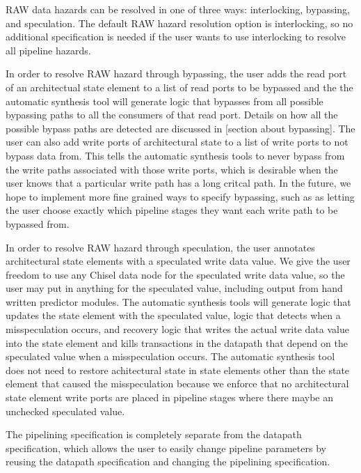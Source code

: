 RAW data hazards can be resolved in one of three ways: interlocking, bypassing, and speculation. The default RAW hazard resolution option is interlocking, so no additional specification is needed if the user wants to use interlocking to resolve all pipeline hazards. 

In order to resolve RAW hazard through bypassing, the user adds the read port of an architectual state element to a list of read ports to be bypassed and the the automatic synthesis tool will generate logic that bypasses from all possible bypassing paths to all the consumers of that read port. Details on how all the possible bypass paths are detected are discussed in [section about bypassing]. The user can also add write ports of architectural state to a list of write ports to not bypass data from. This tells the automatic synthesis tools to never bypass from the write paths associated with those write ports, which is desirable when the user knows that a particular write path has a long critcal path. In the future, we hope to implement more fine grained ways to specify bypassing, such as as letting the user choose exactly which pipeline stages they want each write path to be bypassed from.

In order to resolve RAW hazard through speculation, the user annotates architectural state elements with a speculated write data value. We give the user freedom to use any Chisel data node for the speculated write data value, so the user may put in anything for the speculated value, including output from hand written predictor modules. The automatic synthesis tools will generate logic that updates the state element with the speculated value, logic that detects when a misspeculation occurs, and recovery logic that writes the actual write data value into the state element and kills transactions in the datapath that depend on the speculated value when a misspeculation occurs. The automatic synthesis tool does not need to restore achitectural state in state elements other than the state element that caused the misspeculation because we enforce that no architectural state element write ports are placed in pipeline stages where there maybe an unchecked speculated value.

The pipelining specification is completely separate from the datapath specification, which allows the user to easily change pipeline parameters by reusing the datapath specification and changing the pipelining specification.

